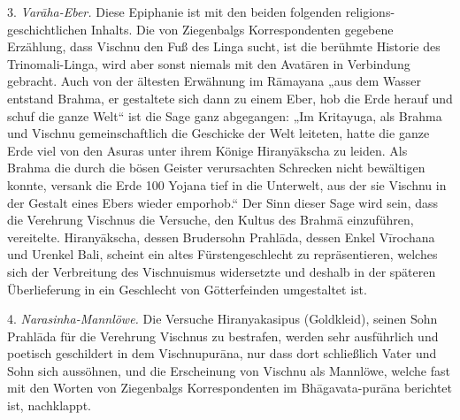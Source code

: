\documentclass{article}
\begin{document}
3. \emph{Var\={a}ha-Eber.} Diese Epiphanie ist mit den beiden folgenden religions-geschichtlichen Inhalts. Die von Ziegenbalgs Korrespondenten gegebene Erzählung, dass Vischnu den Fuß des Linga sucht, ist die berühmte Historie des Trinomali-Linga, wird aber sonst niemals mit den Avat\={a}ren in Verbindung gebracht. Auch von der ältesten Erwähnung im R\={a}mayana „aus dem Wasser entstand Brahma, er gestaltete sich dann zu einem Eber, hob die Erde herauf und schuf die ganze Welt“ ist die Sage ganz abgegangen: „Im Kritayuga, als Brahma und Vischnu gemeinschaftlich die Geschicke der Welt leiteten, hatte die ganze Erde viel von den Asuras unter ihrem Könige Hirany\={a}kscha zu leiden. Als Brahma die durch die bösen Geister verursachten Schrecken nicht bewältigen konnte, versank die Erde 100 Yojana tief in die Unterwelt, aus der sie Vischnu in der Gestalt eines Ebers wieder emporhob.“ Der Sinn dieser Sage wird sein, dass die Verehrung Vischnus die Versuche, den Kultus des Brahm\={a} einzuführen, vereitelte. Hirany\={a}kscha, dessen Brudersohn Prahl\={a}da, dessen Enkel V\={i}rochana und Urenkel Bali, scheint ein altes Fürstengeschlecht zu repräsentieren, welches sich der Verbreitung des Vischnuismus widersetzte und deshalb in der späteren Überlieferung in ein Geschlecht von Götterfeinden umgestaltet ist.

4. \emph{Narasinha-Mannlöwe.} Die Versuche Hiranyakasipus (Goldkleid), seinen Sohn Prahl\={a}da für die Verehrung Vischnus zu bestrafen, werden sehr ausführlich und poetisch geschildert in dem Vischnupur\={a}na, nur dass dort schließlich Vater und Sohn sich aussöhnen, und die Erscheinung von Vischnu als Mannlöwe, welche fast mit den Worten von Ziegenbalgs Korrespondenten im Bh\={a}gavata-pur\={a}na berichtet ist, nachklappt.
\end{document}
